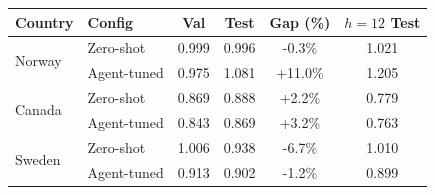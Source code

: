 \begin{tabular}{llcccc}
\toprule
Country & Config & Val & Test & Gap (\%) & $h{=}12$ Test \\
\midrule
\multirow{2}{*}{Norway} & Zero-shot & 0.999 & 0.996 & -0.3\% & 1.021 \\
 & Agent-tuned & 0.975 & 1.081 & +11.0\% & 1.205 \\
\midrule
\multirow{2}{*}{Canada} & Zero-shot & 0.869 & 0.888 & +2.2\% & 0.779 \\
 & Agent-tuned & 0.843 & 0.869 & +3.2\% & 0.763 \\
\midrule
\multirow{2}{*}{Sweden} & Zero-shot & 1.006 & 0.938 & -6.7\% & 1.010 \\
 & Agent-tuned & 0.913 & 0.902 & -1.2\% & 0.899 \\
\bottomrule
\end{tabular}
